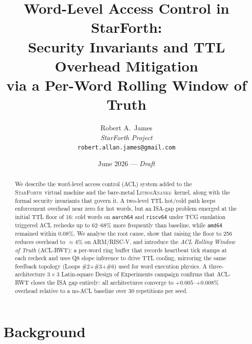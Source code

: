 \documentclass[11pt,letterpaper,openany]{article}
\newcommand{\SF}{\textsc{StarForth}\xspace}
\newcommand{\LK}{\textsc{LithosAnanke}\xspace}
\begin{document}
\title{%
  \textbf{Word-Level Access Control in StarForth:}\\[4pt]
  \large Security Invariants and TTL Overhead Mitigation\\
  via a Per-Word Rolling Window of Truth
}

\author{%
  Robert A.\ James\\
  \small\textit{StarForth Project}\\
  \small\texttt{robert.allan.james@gmail.com}
}

\date{June 2026 \quad --- \quad \textit{Draft}}

\maketitle
\thispagestyle{fancy}

\begin{abstract}
\noindent
We describe the word-level access control (ACL) system added to the
\SF\ virtual machine and the bare-metal \LK\ kernel, along with the
formal security invariants that govern it.  A two-level TTL hot/cold
path keeps enforcement overhead near zero for hot words, but an
ISA-gap problem emerged at the initial TTL floor of 16: cold words on
\texttt{aarch64} and \texttt{riscv64} under TCG emulation triggered
ACL rechecks up to $62$--$68$\% more frequently than baseline,
while \texttt{amd64} remained within $0.08$\%.  We analyse the root
cause, show that raising the floor to 256 reduces overhead to
$\approx\!4$\% on ARM/RISC-V, and introduce the \emph{ACL Rolling
Window of Truth} (ACL-RWT): a per-word ring buffer that records
heartbeat tick stamps at each recheck and uses Q8 slope inference to
drive TTL cooling, mirroring the same feedback topology (Loops
\#2+\#3+\#6) used for word execution physics.  A three-architecture
$3\times3$ Latin-square Design of Experiments campaign confirms that
ACL-RWT closes the ISA gap entirely: all architectures converge to
$+0.005$--$+0.008$\% overhead relative to a no-ACL baseline over 30
repetitions per seed.
\end{abstract}

\tableofcontents
\newpage

\section{Background}
\label{sec:background}
\end{document}
